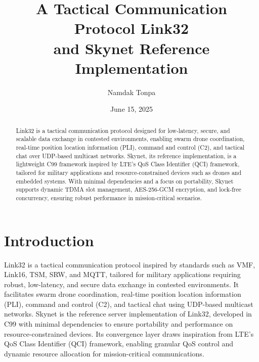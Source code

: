 \documentclass{article}
\begin{document}
\title{A Tactical Communication Protocol Link32 \\ and Skynet Reference Implementation}
\author{Namdak Tonpa}
\date{June 15, 2025}
\maketitle

\begin{abstract}
Link32 is a tactical communication protocol designed for low-latency, secure, and scalable data
exchange in contested environments, enabling swarm drone coordination, real-time position location
information (PLI), command and control (C2), and tactical chat over UDP-based multicast networks.
Skynet, its reference implementation, is a lightweight C99 framework inspired by LTE’s QoS Class
Identifier (QCI) framework, tailored for military applications and resource-constrained devices
such as drones and embedded systems. With minimal dependencies and a focus on portability, Skynet
supports dynamic TDMA slot management, AES-256-GCM encryption, and lock-free concurrency, ensuring
robust performance in mission-critical scenarios.
\end{abstract}

\newpage
\tableofcontents

\newpage
\section{Introduction}
Link32 is a tactical communication protocol inspired by standards such as VMF, Link16, TSM, SRW, and
MQTT, tailored for military applications requiring robust, low-latency, and secure data exchange in
contested environments. It facilitates swarm drone coordination, real-time position location
information (PLI), command and control (C2), and tactical chat using UDP-based multicast networks.
Skynet is the reference server implementation of Link32, developed in C99 with minimal dependencies
to ensure portability and performance on resource-constrained devices. Its convergence layer draws
inspiration from LTE’s QoS Class Identifier (QCI) framework, enabling granular QoS control and
dynamic resource allocation for mission-critical communications.
\end{document}

